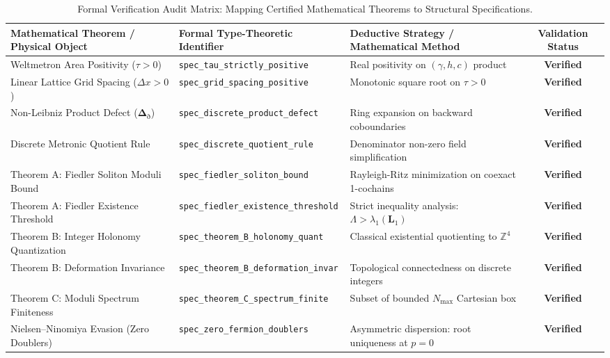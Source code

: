 \documentclass[
    12pt,
    a4paper,
    headings=normal,
    twoside=false,
    open=any,
    parskip=half
]{scrbook}
\newcommand{\ethop}{\eth}
\begin{document}
\begin{table}[htbp]
\centering
\small
\caption{Formal Verification Audit Matrix: Mapping Certified Mathematical Theorems to Structural Specifications.}
\label{tab:appD_lean_audit_matrix}
\begin{adjustbox}{max width=\textwidth}
\begin{tabular}{p{4.2cm}p{4.2cm}p{4.2cm}c}\toprule
\textbf{Mathematical Theorem / Physical Object} & \textbf{Formal Type-Theoretic Identifier} & \textbf{Deductive Strategy / Mathematical Method} & \textbf{Validation Status} \\\midrule
\rowcolor{secondarycolor!8}
Weltmetron Area Positivity ($\tau > 0$) & \texttt{spec\_tau\_strictly\_positive} & Real positivity on $(\gamma, h, c)$ product & \textbf{Verified} \\
Linear Lattice Grid Spacing ($\Delta x > 0$) & \texttt{spec\_grid\_spacing\_positive} & Monotonic square root on $\tau > 0$ & \textbf{Verified} \\
\rowcolor{secondarycolor!8}
Non-Leibniz Product Defect ($\mathbf{\Delta}_\ethop$) & \texttt{spec\_discrete\_product\_defect} & Ring expansion on backward coboundaries & \textbf{Verified} \\
Discrete Metronic Quotient Rule & \texttt{spec\_discrete\_quotient\_rule} & Denominator non-zero field simplification & \textbf{Verified} \\
\rowcolor{secondarycolor!8}
Theorem A: Fiedler Soliton Moduli Bound & \texttt{spec\_fiedler\_soliton\_bound} & Rayleigh-Ritz minimization on coexact 1-cochains & \textbf{Verified} \\
Theorem A: Fiedler Existence Threshold & \texttt{spec\_fiedler\_existence\_threshold} & Strict inequality analysis: $\Lambda > \lambda_1(\mathbf{L}_1)$ & \textbf{Verified} \\
\rowcolor{secondarycolor!8}
Theorem B: Integer Holonomy Quantization & \texttt{spec\_theorem\_B\_holonomy\_quant} & Classical existential quotienting to $\mathbb{Z}^4$ & \textbf{Verified} \\
Theorem B: Deformation Invariance & \texttt{spec\_theorem\_B\_deformation\_invar} & Topological connectedness on discrete integers & \textbf{Verified} \\
\rowcolor{secondarycolor!8}
Theorem C: Moduli Spectrum Finiteness & \texttt{spec\_theorem\_C\_spectrum\_finite} & Subset of bounded $N_{\max}$ Cartesian box & \textbf{Verified} \\
Nielsen--Ninomiya Evasion (Zero Doublers) & \texttt{spec\_zero\_fermion\_doublers} & Asymmetric dispersion: root uniqueness at $p = 0$ & \textbf{Verified} \\

\end{tabular}
\end{adjustbox}
\end{table}
\end{document}
